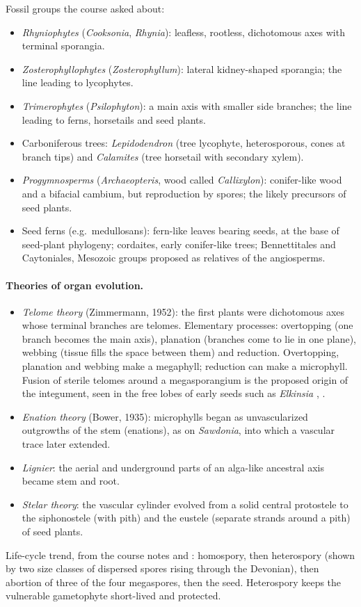 Fossil groups the course asked about:
\begin{itemize}
\item \emph{Rhyniophytes} (\emph{Cooksonia},
\emph{Rhynia}): leafless, rootless,
dichotomous axes with terminal sporangia.
\item \emph{Zosterophyllophytes}
(\emph{Zosterophyllum}): lateral
kidney-shaped sporangia; the line leading
to lycophytes.
\item \emph{Trimerophytes}
(\emph{Psilophyton}): a main axis with
smaller side branches; the line leading to
ferns, horsetails and seed plants.
\item Carboniferous trees:
\emph{Lepidodendron} (tree lycophyte,
heterosporous, cones at branch tips) and
\emph{Calamites} (tree horsetail with
secondary xylem).
\item \emph{Progymnosperms}
(\emph{Archaeopteris}, wood called
\emph{Callixylon}): conifer-like wood and
a bifacial cambium, but reproduction by
spores; the likely precursors of seed
plants.
\item Seed ferns (e.g.\ medullosans):
fern-like leaves bearing seeds, at the base
of seed-plant phylogeny; cordaites, early
conifer-like trees; Bennettitales and
Caytoniales, Mesozoic groups proposed as
relatives of the angiosperms.
\end{itemize}

\paragraph{Theories of organ evolution.}
\begin{itemize}
\item \emph{Telome theory} (Zimmermann,
1952): the first plants were dichotomous
axes whose terminal branches are telomes.
Elementary processes: overtopping (one
branch becomes the main axis), planation
(branches come to lie in one plane),
webbing (tissue fills the space between
them) and reduction. Overtopping, planation
and webbing make a megaphyll; reduction
can make a microphyll. Fusion of sterile
telomes around a megasporangium is the
proposed origin of the integument, seen in
the free lobes of early seeds such as
\emph{Elkinsia} \cite[Chapter
4]{willis2002evolution},
\cite[Chapters 17--18]{evert2013raven}.
\item \emph{Enation theory} (Bower, 1935):
microphylls began as unvascularized
outgrowths of the stem (enations), as on
\emph{Sawdonia}, into which a vascular trace
later extended.
\item \emph{Lignier}: the aerial and
underground parts of an alga-like ancestral
axis became stem and root.
\item \emph{Stelar theory}: the vascular
cylinder evolved from a solid central
protostele to the siphonostele (with pith)
and the eustele (separate strands around a
pith) of seed plants.
\end{itemize}
Life-cycle trend, from the course notes and
\cite[Chapter 4]{willis2002evolution}:
homospory, then heterospory (shown by two
size classes of dispersed spores rising
through the Devonian), then abortion of
three of the four megaspores, then the
seed. Heterospory keeps the vulnerable
gametophyte short-lived and protected.

